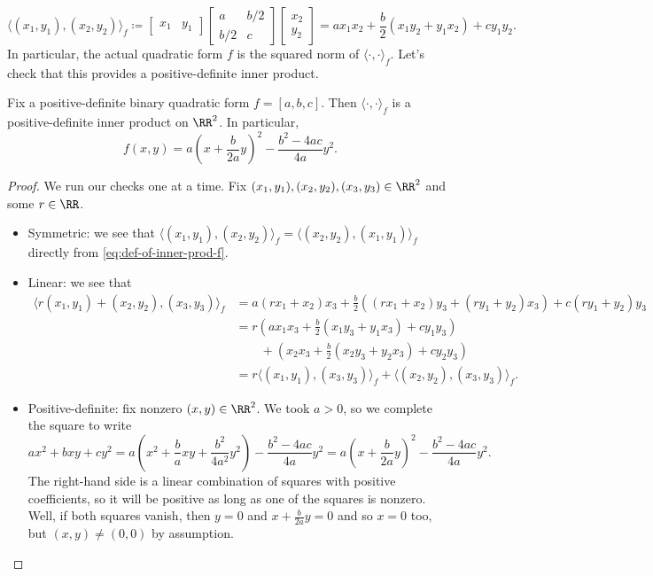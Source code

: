 \documentclass[../notes.tex]{subfiles}
\begin{document}
\begin{equation}
	\langle(x_1,y_1),(x_2,y_2)\rangle_f\coloneqq\begin{bmatrix}
		x_1 & y_1
	\end{bmatrix}\begin{bmatrix}
		a & b/2 \\ b/2 & c
	\end{bmatrix}\begin{bmatrix}
		x_2 \\ y_2
	\end{bmatrix}=ax_1x_2+\frac b2(x_1y_2+y_1x_2)+cy_1y_2. \label{eq:def-of-inner-prod-f}
\end{equation}
In particular, the actual quadratic form $f$ is the squared norm of $\langle\cdot,\cdot\rangle_f$. Let's check that this provides a positive-definite inner product.
\begin{lemma} \label{lem:get-pos-def-inner-prod}
	Fix a positive-definite binary quadratic form $f=[a,b,c]$. Then $\langle\cdot,\cdot\rangle_f$ is a positive-definite inner product on $\RR^2$. In particular,
	\[f(x,y)=a\left(x+\frac b{2a}y\right)^2-\frac{b^2-4ac}{4a}y^2.\]
\end{lemma}
\begin{proof}
	We run our checks one at a time. Fix $(x_1,y_1),(x_2,y_2),(x_3,y_3)\in\RR^2$ and some $r\in\RR$.
	\begin{itemize}
		\item Symmetric: we see that $\langle(x_1,y_1),(x_2,y_2)\rangle_f=\langle(x_2,y_2),(x_1,y_1)\rangle_f$ directly from \eqref{eq:def-of-inner-prod-f}.
		\item Linear: we see that
		\begin{align*}
			\langle r(x_1,y_1)+(x_2,y_2),(x_3,y_3)\rangle_f &= a(rx_1+x_2)x_3+\frac b2((rx_1+x_2)y_3+(ry_1+y_2)x_3)+c(ry_1+y_2)y_3 \\
			&= r\left(ax_1x_3+\frac b2(x_1y_3+y_1x_3)+cy_1y_3\right) \\
			&\qquad+\left(x_2x_3+\frac b2(x_2y_3+y_2x_3)+cy_2y_3\right) \\
			&= r\langle(x_1,y_1),(x_3,y_3)\rangle_f+\langle(x_2,y_2),(x_3,y_3)\rangle_f.
		\end{align*}
		\item Positive-definite: fix nonzero $(x,y)\in\RR^2$. We took $a>0$, so we complete the square to write
		\[ax^2+bxy+cy^2=a\left(x^2+\frac baxy+\frac{b^2}{4a^2}y^2\right)-\frac{b^2-4ac}{4a}y^2=a\left(x+\frac b{2a}y\right)^2-\frac{b^2-4ac}{4a}y^2.\]
		The right-hand side is a linear combination of squares with positive coefficients, so it will be positive as long as one of the squares is nonzero. Well, if both squares vanish, then $y=0$ and $x+\frac b{2a}y=0$ and so $x=0$ too, but $(x,y)\ne(0,0)$ by assumption.
		\qedhere
	\end{itemize}
\end{proof}
\end{document}
